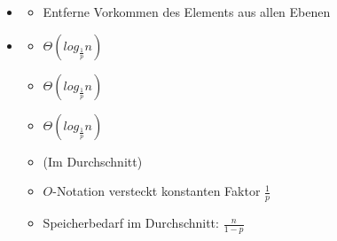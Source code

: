 \documentclass[
    12pt,
    a4paper,
    ngerman,
    color=3b,%
    marginpar=false,
    colorback=false,
    leqno,
]{tudaexercise}
\begin{document}
\begin{itemize}
        \item {}
            \begin{itemize}
                \item Entferne Vorkommen des Elements aus allen Ebenen
            \end{itemize}
        
        \item {}
            \begin{itemize}
                \item {} $\Theta(log_{\frac{1}{p}}n)$
                \item {} $\Theta(log_{\frac{1}{p}}n)$
                \item {} $\Theta(log_{\frac{1}{p}}n)$
                \item (Im Durchschnitt)
                \item $O$-Notation versteckt konstanten Faktor $\frac{1}{p}$
                \item Speicherbedarf im Durchschnitt: $\frac{n}{1-p}$
            \end{itemize}
    \end{itemize}
\clearpage
\end{document}
